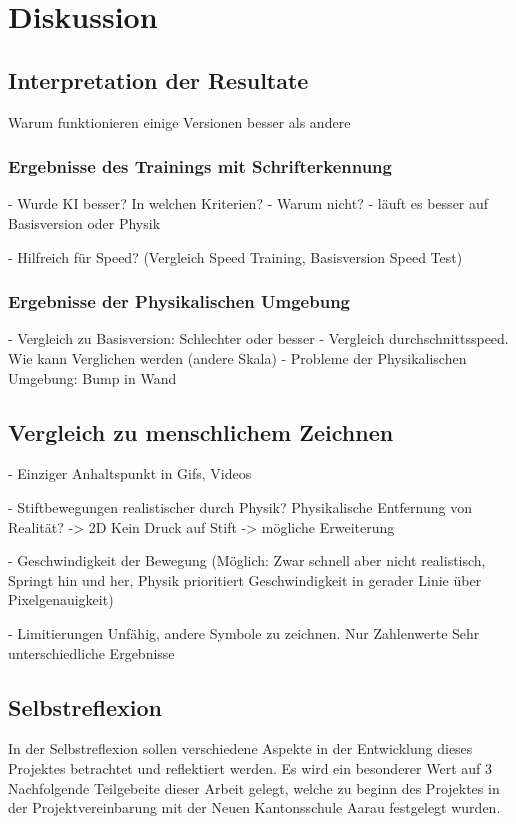 \chapter{Diskussion}

\section{Interpretation der Resultate}
Warum funktionieren einige Versionen besser als andere

\subsection*{Ergebnisse des Trainings mit Schrifterkennung}
- Wurde KI besser? In welchen Kriterien?
- Warum nicht?
- läuft es besser auf Basisversion oder Physik

- Hilfreich für Speed? (Vergleich Speed Training, Basisversion Speed Test)

\subsection*{Ergebnisse der Physikalischen Umgebung}
- Vergleich zu Basisversion: Schlechter oder besser
- Vergleich durchschnittsspeed. Wie kann Verglichen werden (andere Skala)
- Probleme der Physikalischen Umgebung: Bump in Wand

\section{Vergleich zu menschlichem Zeichnen}
- Einziger Anhaltspunkt in Gifs, Videos

- Stiftbewegungen realistischer durch Physik?
Physikalische Entfernung von Realität? -> 2D Kein Druck auf Stift -> mögliche Erweiterung

- Geschwindigkeit der Bewegung
    (Möglich: Zwar schnell aber nicht realistisch, Springt hin und her, Physik prioritiert Geschwindigkeit in gerader Linie über Pixelgenauigkeit)

- Limitierungen
    Unfähig, andere Symbole zu zeichnen. Nur Zahlenwerte
    Sehr unterschiedliche Ergebnisse


\section{Selbstreflexion}
In der Selbstreflexion sollen verschiedene Aspekte in der Entwicklung dieses
Projektes betrachtet und reflektiert werden. Es wird ein besonderer Wert auf 3
Nachfolgende Teilgebeite dieser Arbeit gelegt, welche zu beginn des Projektes in
der Projektvereinbarung mit der Neuen Kantonsschule Aarau festgelegt wurden.

